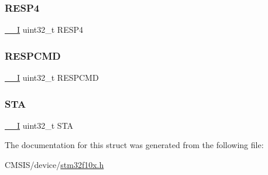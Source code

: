 \subsubsection{\texorpdfstring{RESP4}{RESP4}}
{\footnotesize\ttfamily \mbox{\hyperlink{core__sc300_8h_af63697ed9952cc71e1225efe205f6cd3}{\+\_\+\+\_\+I}} uint32\+\_\+t R\+E\+S\+P4}

\mbox{\label{struct_s_d_i_o___type_def_aad371db807e2db4a2edf05b3f2f4b6cd}} 
\subsubsection{\texorpdfstring{RESPCMD}{RESPCMD}}
{\footnotesize\ttfamily \mbox{\hyperlink{core__sc300_8h_af63697ed9952cc71e1225efe205f6cd3}{\+\_\+\+\_\+I}} uint32\+\_\+t R\+E\+S\+P\+C\+MD}

\mbox{\label{struct_s_d_i_o___type_def_a7520cdf6f3df68c2f147bdd87fb8a96f}} 
\subsubsection{\texorpdfstring{STA}{STA}}
{\footnotesize\ttfamily \mbox{\hyperlink{core__sc300_8h_af63697ed9952cc71e1225efe205f6cd3}{\+\_\+\+\_\+I}} uint32\+\_\+t S\+TA}



The documentation for this struct was generated from the following file\+:\begin{DoxyCompactItemize}
\item 
C\+M\+S\+I\+S/device/\mbox{\hyperlink{stm32f10x_8h}{stm32f10x.\+h}}\end{DoxyCompactItemize}
